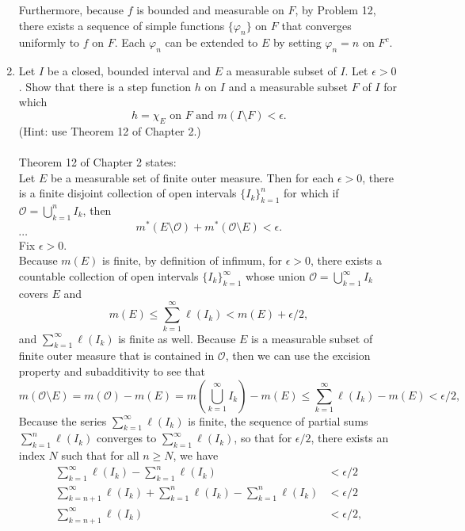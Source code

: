 \begin{enumerate}
    Furthermore, because $f$ is bounded and measurable on $F$, by Problem 12, there exists a sequence of simple functions $\{\varphi_n\}$ on $F$ that converges uniformly to $f$ on $F$.
    Each $\varphi_n$ can be extended to $E$ by setting $\varphi_n=n$ on $F^c$.
    \item Let $I$ be a closed, bounded interval and $E$ a measurable subset of $I$. Let $\epsilon>0$.
    Show that there is a step function $h$ on $I$ and a measurable subset $F$ of $I$ for which 
    \[
        h=\chi_E\text{ on }F\text{ and }m(I\setminus F)<\epsilon.    
    \]
    (Hint: use Theorem 12 of Chapter 2.)\\
    \\Theorem 12 of Chapter 2 states:
    \\Let $E$ be a measurable set of finite outer measure.
    Then for each $\epsilon>0$, there is a finite disjoint collection of open intervals $\{I_k\}_{k=1}^n$ for which if $\mathcal{O}=\bigcup_{k=1}^n I_k$, then
    \[
        m^*(E\setminus\mathcal{O})+m^*(\mathcal{O}\setminus E)<\epsilon.    
    \]
    $\cdots$\\
    Fix $\epsilon>0$.\\
    Because $m(E)$ is finite, by definition of infimum, for $\epsilon>0$, there exists a countable collection of open intervals $\{I_k\}_{k=1}^\infty$ whose union $\mathcal{O}=\bigcup_{k=1}^\infty I_k$ covers $E$ and 
    \[
        m(E)\le \sum_{k=1}^\infty \ell(I_k)< m(E)+\epsilon/2,
    \]
    and $\sum_{k=1}^\infty\ell(I_k)$ is finite as well.
    Because $E$ is a measurable subset of finite outer measure that is contained in $\mathcal{O}$, then we can use the excision property and subadditivity to see that
    \begin{equation}
        m(\mathcal{O}\setminus E)=m(\mathcal{O})-m(E)=m(\bigcup_{k=1}^\infty I_k)-m(E)\le\sum_{k=1}^\infty \ell(I_k)-m(E)< \epsilon/2,\tag{1}
    \end{equation}
    Because the series $\sum_{k=1}^\infty\ell(I_k)$ is finite, the sequence of partial sums $\sum_{k=1}^n\ell(I_k)$ converges to $\sum_{k=1}^\infty\ell(I_k)$, so that for $\epsilon/2$, there exists an index $N$ such that for all $n\ge N$, we have
    \begin{align*}
        \sum_{k=1}^\infty\ell(I_k)-\sum_{k=1}^n\ell(I_k) &<\epsilon/2\\
        \sum_{k=n+1}^\infty\ell(I_k)+\sum_{k=1}^n\ell(I_k)-\sum_{k=1}^n\ell(I_k) &<\epsilon/2\\
        \sum_{k=n+1}^\infty\ell(I_k)&<\epsilon/2,
    \end{align*}

\end{enumerate}

